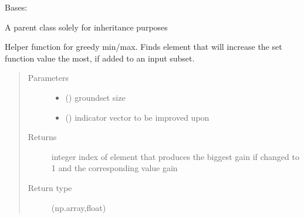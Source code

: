 \documentclass[letterpaper,10pt,english]{sphinxmanual}
\begin{document}
\begin{fulllineitems}
\label{\detokenize{setFTs:setFTs.setfunctions.SetFunction}}
\sphinxAtStartPar
Bases: 

\sphinxAtStartPar
A parent class solely for inheritance purposes

\begin{fulllineitems}
\label{\detokenize{setFTs:setFTs.setfunctions.SetFunction.gains}}
\sphinxAtStartPar
Helper function for greedy min/max. Finds element that will increase the set function value the most, if added to an input subset.
\begin{quote}\begin{description}
\item[{Parameters}] \leavevmode\begin{itemize}
\item {} 
\sphinxAtStartPar
{} () \textendash{} groundset size

\item {} 
\sphinxAtStartPar
{} () \textendash{} indicator vector to be improved upon

\end{itemize}

\item[{Returns}] \leavevmode
\sphinxAtStartPar
integer index of element that produces the biggest gain if changed to 1 and the corresponding value gain

\item[{Return type}] \leavevmode
\sphinxAtStartPar
(np.array,float)

\end{description}\end{quote}


\end{fulllineitems}
\end{fulllineitems}
\end{document}
